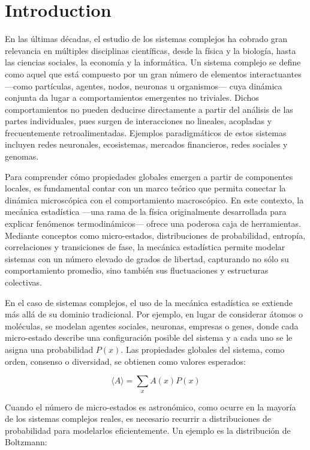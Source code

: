 \section{Introduction}

En las últimas décadas, el estudio de los sistemas complejos ha cobrado gran relevancia en múltiples disciplinas científicas, desde la física y la biología, hasta las ciencias sociales, la economía y la informática. Un sistema complejo se define como aquel que está compuesto por un gran número de elementos interactuantes —como partículas, agentes, nodos, neuronas u organismos— cuya dinámica conjunta da lugar a comportamientos emergentes no triviales. Dichos comportamientos no pueden deducirse directamente a partir del análisis de las partes individuales, pues surgen de interacciones no lineales, acopladas y frecuentemente retroalimentadas. Ejemplos paradigmáticos de estos sistemas incluyen redes neuronales, ecosistemas, mercados financieros, redes sociales y genomas.

Para comprender cómo propiedades globales emergen a partir de componentes locales, es fundamental contar con un marco teórico que permita conectar la dinámica microscópica con el comportamiento macroscópico. En este contexto, la mecánica estadística —una rama de la física originalmente desarrollada para explicar fenómenos termodinámicos— ofrece una poderosa caja de herramientas. Mediante conceptos como micro-estados, distribuciones de probabilidad, entropía, correlaciones y transiciones de fase, la mecánica estadística permite modelar sistemas con un número elevado de grados de libertad, capturando no sólo su comportamiento promedio, sino también sus fluctuaciones y estructuras colectivas.

En el caso de sistemas complejos, el uso de la mecánica estadística se extiende más allá de su dominio tradicional. Por ejemplo, en lugar de considerar átomos o moléculas, se modelan agentes sociales, neuronas, empresas o genes, donde cada micro-estado describe una configuración posible del sistema y a cada uno se le asigna una probabilidad $P(x)$. Las propiedades globales del sistema, como orden, consenso o diversidad, se obtienen como valores esperados:

\[
    \langle A \rangle = \sum_x A(x)P(x)
\]


\cite{huang1987statistical}Cuando el número de micro-estados es astronómico, como ocurre en la mayoría de los sistemas complejos reales, es necesario recurrir a distribuciones de probabilidad para modelarlos eficientemente. Un ejemplo es la distribución de Boltzmann:


